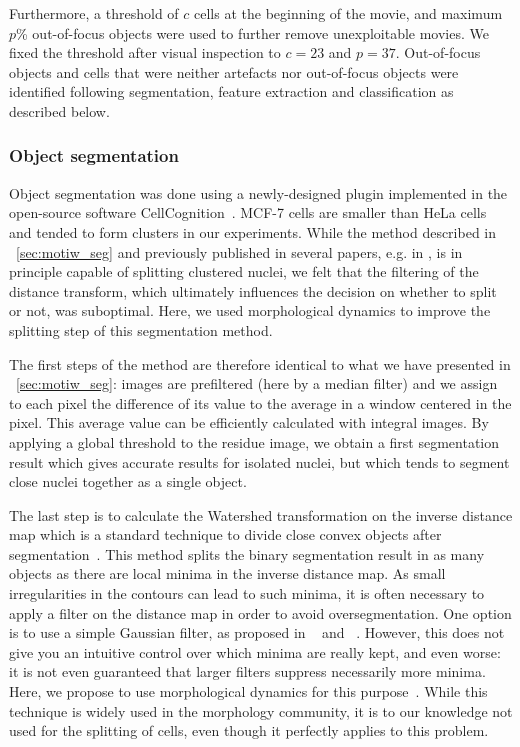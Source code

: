 Furthermore, a threshold of $c$ cells at the beginning of the movie, and maximum $p$\% out-of-focus objects were used to further remove unexploitable movies.   
We fixed the threshold after visual inspection to $c=23$ and $p=37$. Out-of-focus objects and cells that were neither artefacts nor out-of-focus objects were identified following segmentation, feature extraction and classification as described below.

\subsubsection{Object segmentation}

Object segmentation was done using a newly-designed plugin implemented
in the open-source software CellCognition~\cite{cellcognition}. MCF-7
cells are smaller than HeLa cells and tended to form clusters in our
experiments. While the method described in ~\ref{sec:motiw_seg}
and previously published in several papers, e.g. in
\cite{cellcognition}, is in principle capable of splitting clustered
nuclei, we felt that the filtering of the distance transform, 
which ultimately influences the decision on whether to split or not, was suboptimal. 
Here, we used morphological dynamics to improve the splitting step of
this segmentation method.

The first steps of the method are therefore identical to what we have
presented in ~\ref{sec:motiw_seg}: images are prefiltered (here by a
median filter) and we assign to each pixel the difference of its value
to the average in a window centered in the pixel. This average value
can be efficiently calculated with integral images. By applying a
global threshold to the residue image, we obtain a first segmentation
result which gives accurate results for isolated nuclei, but which
tends to segment close nuclei together as a single object. 

The last step is to calculate the Watershed transformation on the
inverse distance map which is a
standard technique to divide close convex objects after
segmentation~\cite[Chapter Geodesic segmentation]{lantuejoul}. This
method splits the binary segmentation
result in as many objects as there are local minima in the inverse
distance map. As small irregularities in the contours can lead to such
minima, it is often necessary to apply a filter on the distance map in
order to avoid oversegmentation. One option is to use a simple
Gaussian filter, as proposed in ~\cite{Wahlby2002} and
~\cite{cellcognition}. However, this does not give you an intuitive
control over which minima are really kept, and even worse: it is not
even guaranteed that larger filters suppress necessarily more minima. 
Here, we propose to use morphological dynamics for this
purpose~\cite{Soille:2003:MIA:773286}.  While this technique is widely
used in the morphology community, it is to our knowledge not used for
the splitting of cells, even though it perfectly applies to this
problem. 

